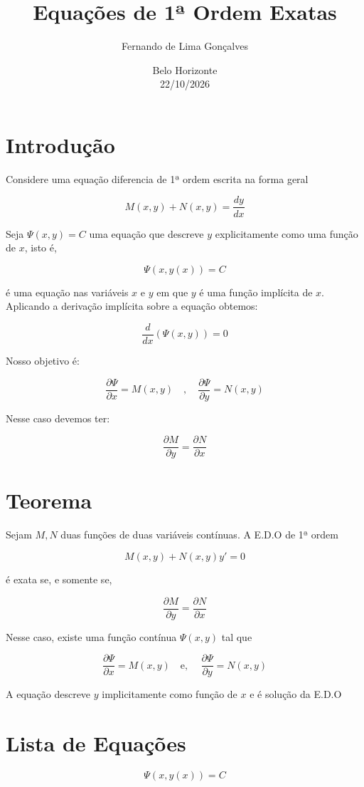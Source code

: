 \documentclass[12pt,a4paper,titlepage]{article}
\title{Equações de 1ª Ordem Exatas}
\author{Fernando de Lima Gonçalves}
\date{Belo Horizonte\\22/10/2026}
\begin{document}
\maketitle
\tableofcontents

\section{Introdução}
Considere uma equação diferencia de 1ª ordem escrita na forma geral

\[
    M(x,y) + N(x,y) = \frac{dy}{dx}
\]

Seja $\Psi(x,y) = C$ uma equação que descreve $y$ explicitamente como uma função de $x$, isto é,

\[
    \Psi(x,y(x)) = C
\]

é uma equação nas variáveis $x$ e $y$ em que $y$ é uma função implícita de $x$.
Aplicando a derivação implícita sobre a equação obtemos:

\[
    \frac{d}{dx}(\Psi(x,y)) = 0
\]

Nosso objetivo é:

\[
    \frac{\partial \Psi}{\partial x} = M(x,y) \quad , \quad \frac{\partial \Psi}{\partial y} = N(x,y)
\]

Nesse caso devemos ter:

\[
    \frac{\partial M}{\partial y} = \frac{\partial N}{\partial x}
\]

\section{Teorema}
Sejam $M,N$ duas funções de duas variáveis contínuas.
A E.D.O de 1ª ordem 

\[
    M(x,y) + N(x,y) y' = 0
\]

é exata se, e somente se, 

\[
    \frac{\partial M}{\partial y} = \frac{\partial N}{\partial x}
\]

Nesse caso, existe uma função contínua $\Psi(x,y)$ tal que 

\[
    \frac{\partial \Psi}{\partial x} = M(x,y) \quad \text{e, } \quad \frac{\partial \Psi}{\partial y} = N(x,y)
\]

A equação  descreve $y$ implicitamente como função de $x$ e é solução da E.D.O

\section{Lista de Equações}
\[
    \boxed{\Psi(x,y(x)) = C}
\]
\end{document}
